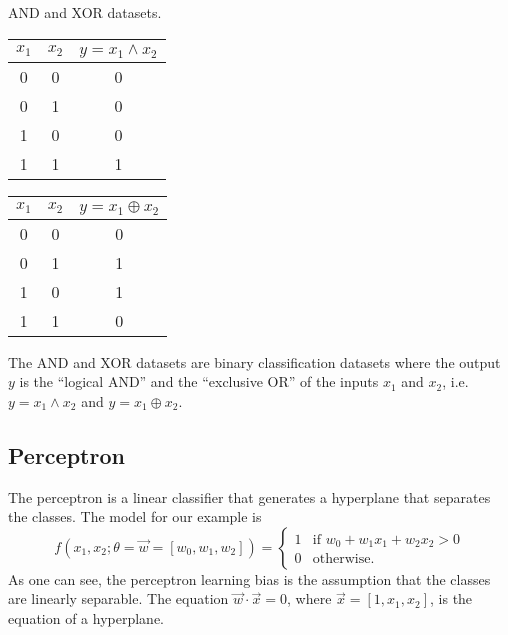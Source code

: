 \begin{tablebox}[label=tab:and-xor]{AND and XOR datasets.}
  \centering
  \begin{minipage}{0.45\textwidth}
    \centering
    \begin{tabular}{ccc}
      \toprule
      $x_1$ & $x_2$ & $y = x_1 \land x_2$ \\
      \midrule
      0 & 0 & 0 \\
      0 & 1 & 0 \\
      1 & 0 & 0 \\
      1 & 1 & 1 \\
      \bottomrule
    \end{tabular}
  \end{minipage}
  \begin{minipage}{0.45\textwidth}
  \centering
  \begin{tabular}{ccc}
    \toprule
    $x_1$ & $x_2$ & $y = x_1 \oplus x_2$ \\
    \midrule
    0 & 0 & 0 \\
    0 & 1 & 1 \\
    1 & 0 & 1 \\
    1 & 1 & 0 \\
    \bottomrule
  \end{tabular}
  \end{minipage}
  \tcblower
  The AND and XOR datasets are binary classification datasets where the output $y$ is the
  ``logical AND'' and the ``exclusive OR'' of the inputs $x_1$ and $x_2$, i.e.
  $y = x_1 \land x_2$ and $y = x_1 \oplus x_2$.
\end{tablebox}

\subsection{Perceptron}

The perceptron is a linear classifier that generates a hyperplane that separates the
classes.  The model for our example is
\begin{equation*}
  f(x_1, x_2; \theta = \vec{w} = \left[w_0, w_1, w_2\right]) =  \begin{cases}
    1 & \text{if } w_0 + w_1 x_1 + w_2 x_2 > 0 \\
    0 & \text{otherwise.}
  \end{cases}
\end{equation*}
As one can see, the perceptron learning bias is the assumption that the classes are
linearly separable. The equation $\vec{w} \cdot \vec{x} = 0$, where $\vec{x} = [1, x_1,
x_2]$, is the equation of a hyperplane.

